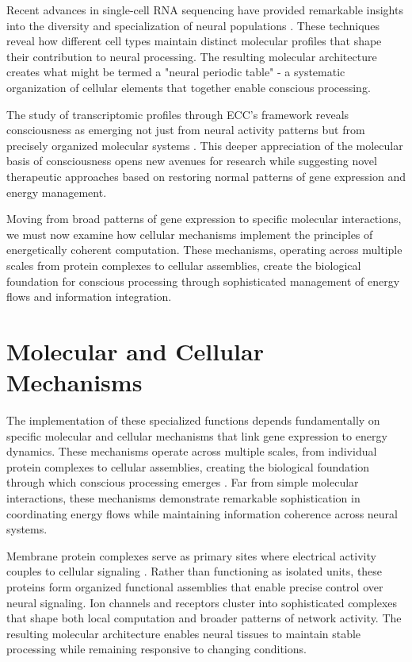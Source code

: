 \begin{refsection}
Recent advances in single-cell RNA sequencing have provided remarkable insights into the diversity and specialization of neural populations \cite{Lake2016}. These techniques reveal how different cell types maintain distinct molecular profiles that shape their contribution to neural processing. The resulting molecular architecture creates what might be termed a "neural periodic table" - a systematic organization of cellular elements that together enable conscious processing.

The study of transcriptomic profiles through ECC's framework reveals consciousness as emerging not just from neural activity patterns but from precisely organized molecular systems \cite{Zeng2017}. This deeper appreciation of the molecular basis of consciousness opens new avenues for research while suggesting novel therapeutic approaches based on restoring normal patterns of gene expression and energy management.

Moving from broad patterns of gene expression to specific molecular interactions, we must now examine how cellular mechanisms implement the principles of energetically coherent computation. These mechanisms, operating across multiple scales from protein complexes to cellular assemblies, create the biological foundation for conscious processing through sophisticated management of energy flows and information integration.

\section{Molecular and Cellular Mechanisms}

The implementation of these specialized functions depends fundamentally on specific molecular and cellular mechanisms that link gene expression to energy dynamics. These mechanisms operate across multiple scales, from individual protein complexes to cellular assemblies, creating the biological foundation through which conscious processing emerges \cite{Baluska2016}. Far from simple molecular interactions, these mechanisms demonstrate remarkable sophistication in coordinating energy flows while maintaining information coherence across neural systems.

Membrane protein complexes serve as primary sites where electrical activity couples to cellular signaling \cite{Barker2018}. Rather than functioning as isolated units, these proteins form organized functional assemblies that enable precise control over neural signaling. Ion channels and receptors cluster into sophisticated complexes that shape both local computation and broader patterns of network activity. The resulting molecular architecture enables neural tissues to maintain stable processing while remaining responsive to changing conditions.


\end{refsection}
